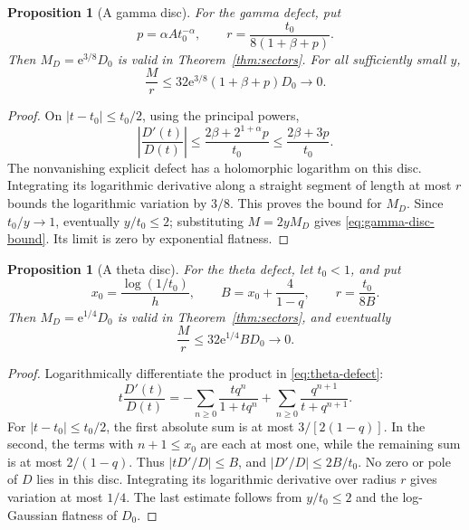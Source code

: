 \documentclass[11pt,a4paper]{article}
\numberwithin{equation}{section}
\newtheorem{proposition}[theorem]{Proposition}
\theoremstyle{definition}
\theoremstyle{remark}
\newcommand{\ee}{\mathrm e}
\begin{document}
\begin{proposition}[A gamma disc]
\label{prop:gamma-disc}
For the gamma defect, put
\begin{equation}
 p=\alpha A t_0^{-\alpha},\qquad
 r=\frac{t_0}{8(1+\beta+p)}.
 \label{eq:gamma-disc}
\end{equation}
Then \(M_D=\ee^{3/8}D_0\) is valid in
Theorem~\ref{thm:sectors}. For all sufficiently small \(y\),
\begin{equation}
 \frac Mr\le32\ee^{3/8}(1+\beta+p)D_0\longrightarrow0.
 \label{eq:gamma-disc-bound}
\end{equation}
\end{proposition}
\begin{proof}
On \(|t-t_0|\le t_0/2\), using the principal powers,
\[
 \left|\frac{D'(t)}{D(t)}\right|
 \le\frac{2\beta+2^{1+\alpha}p}{t_0}
 \le\frac{2\beta+3p}{t_0}.
\]
The nonvanishing explicit defect has a holomorphic logarithm on this
disc. Integrating its logarithmic derivative along a straight segment
of length at most \(r\) bounds the logarithmic variation by \(3/8\).
This proves the bound for \(M_D\). Since \(t_0/y\to1\), eventually
\(y/t_0\le2\); substituting \(M=2yM_D\) gives
\eqref{eq:gamma-disc-bound}. Its limit is zero by exponential flatness.
\end{proof}

\begin{proposition}[A theta disc]
\label{prop:q-disc}
For the theta defect, let \(t_0<1\), and put
\begin{equation}
 x_0=\frac{\log(1/t_0)}h,\qquad
 B=x_0+\frac4{1-q},\qquad r=\frac{t_0}{8B}.
 \label{eq:q-disc}
\end{equation}
Then \(M_D=\ee^{1/4}D_0\) is valid in
Theorem~\ref{thm:sectors}, and eventually
\begin{equation}
 \frac Mr\le32\ee^{1/4}BD_0\longrightarrow0.
 \label{eq:q-disc-bound}
\end{equation}
\end{proposition}
\begin{proof}
Logarithmically differentiate the product in
\eqref{eq:theta-defect}:
\[
 t\frac{D'(t)}{D(t)}
 =-\sum_{n\ge0}\frac{tq^n}{1+tq^n}
   +\sum_{n\ge0}\frac{q^{n+1}}{t+q^{n+1}}.
\]
For \(|t-t_0|\le t_0/2\), the first absolute sum is at most
\(3/[2(1-q)]\). In the second, the terms with \(n+1\le x_0\) are each
at most one, while the remaining sum is at most \(2/(1-q)\).
Thus \(|tD'/D|\le B\), and \(|D'/D|\le2B/t_0\).
No zero or pole of \(D\) lies in this disc. Integrating its logarithmic
derivative over radius \(r\) gives variation at most \(1/4\). The last
estimate follows from \(y/t_0\le2\) and the log-Gaussian flatness of
\(D_0\).
\end{proof}
\end{document}
